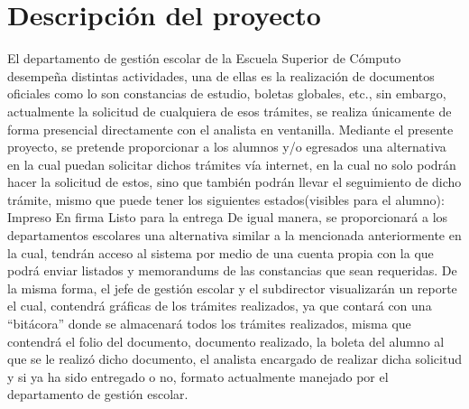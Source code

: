 \section{Descripción del proyecto}

El departamento de gestión escolar de la Escuela Superior de Cómputo desempeña distintas actividades, una de ellas es la realización de documentos oficiales como lo son constancias de estudio, boletas globales, etc., sin embargo, actualmente la solicitud de cualquiera de esos trámites, se realiza únicamente de forma presencial directamente con el analista en ventanilla.
\newline
\newline
Mediante el presente proyecto, se pretende proporcionar a los alumnos y/o egresados una alternativa en la cual puedan solicitar dichos trámites vía internet, en la cual no solo podrán hacer la solicitud de estos, sino que también podrán llevar el seguimiento de dicho trámite, mismo que puede tener los siguientes estados(visibles para el alumno):
Impreso
En firma 
Listo para la entrega
\newline
\newline
De igual manera,  se proporcionará a los departamentos escolares una alternativa similar a la mencionada anteriormente en la cual, tendrán acceso al sistema por medio de una cuenta propia con la que podrá enviar listados y memorandums de las constancias que sean requeridas.
\newline
\newline
De la misma forma, el jefe de gestión escolar y el subdirector visualizarán un reporte el cual, contendrá gráficas de los trámites realizados, ya que contará con una “bitácora” donde se almacenará todos los trámites realizados, misma que contendrá el folio del documento, documento realizado, la boleta del alumno al que se le realizó dicho documento, el analista encargado de realizar dicha solicitud y si ya ha sido entregado o no, formato actualmente manejado por el departamento de gestión escolar.

